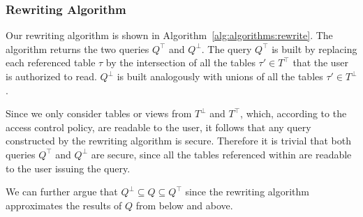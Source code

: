 \subsubsection{Rewriting Algorithm}
%
Our rewriting algorithm is shown in Algorithm~\ref{alg:algorithms:rewrite}.
%
The algorithm returns the two queries $Q^\top$ and $Q^\bot$.
%
The query $Q^\top$ is built by replacing each referenced table $\tau$ by the intersection of all the tables $\tau' \in T^\top$ that the user is authorized to read.
%
$Q^\bot$ is built analogously with unions of all the tables $\tau' \in T^\bot$.


Since we only consider tables or views from $T^\bot$ and $T^\top$, which, according to the access control policy, are readable to the user, it follows that any query constructed by the rewriting algorithm is secure. 
%
Therefore it is trivial that both queries $Q^\top$ and $Q^\bot$ are secure, since all the tables referenced within are readable to the user issuing the query.

We can further argue that $Q^\bot \subseteq Q \subseteq Q^\top$ since the rewriting algorithm approximates the results of $Q$ from below and above. 
%


